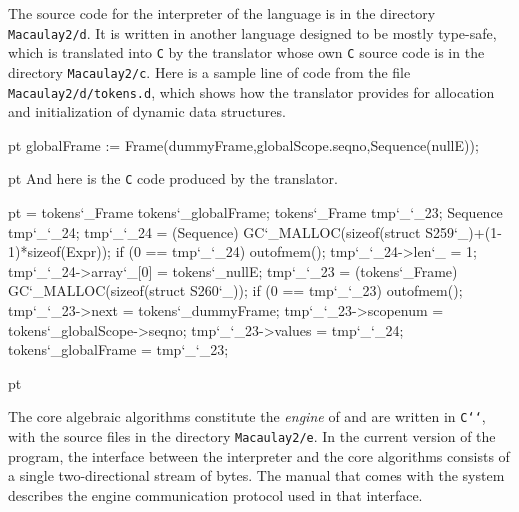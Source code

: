 The source code for the interpreter of the \Mtwo language is in the directory
{\tt Macaulay2/d}.  It is written in another language designed to be mostly
type-safe, which is translated into {\tt C} by the translator whose own
{\tt C} source code is in the directory {\tt Macaulay2/c}.  Here is a
sample line of code from the file {\tt Macaulay2/d/tokens.d}, which shows how
the translator provides for allocation and initialization of dynamic data
structures.
\par
{} pt
\begingroup
\tteight
\baselineskip=8pt
\lineskip=0pt
\obeyspaces
globalFrame := Frame(dummyFrame,globalScope.seqno,Sequence(nullE));\leavevmode\hss\endgraf
\endgroup
{}
\par
{} pt
\noindent
And here is the {\tt C} code produced by the translator.
\par
{} pt
\begingroup
\tteight
\baselineskip=\outputBaseLineSkip
\lineskip=0pt
\obeyspaces
\obeylines
tokens\char`\_Frame tokens\char`\_globalFrame;
tokens\char`\_Frame tmp\char`\_\char`\_23;
Sequence tmp\char`\_\char`\_24;
tmp\char`\_\char`\_24 = (Sequence) GC\char`\_MALLOC(sizeof(struct S259\char`\_)+(1-1)*sizeof(Expr));
if (0 == tmp\char`\_\char`\_24) outofmem();
tmp\char`\_\char`\_24->len\char`\_ = 1;
tmp\char`\_\char`\_24->array\char`\_[0] = tokens\char`\_nullE;
tmp\char`\_\char`\_23 = (tokens\char`\_Frame) GC\char`\_MALLOC(sizeof(struct S260\char`\_));
if (0 == tmp\char`\_\char`\_23) outofmem();
tmp\char`\_\char`\_23->next = tokens\char`\_dummyFrame;
tmp\char`\_\char`\_23->scopenum = tokens\char`\_globalScope->seqno;
tmp\char`\_\char`\_23->values = tmp\char`\_\char`\_24;
tokens\char`\_globalFrame = tmp\char`\_\char`\_23;
\endgroup
{}
\par
{} pt

The core algebraic algorithms constitute the {\sl engine} of \Mtwo and are
written in {\tt C\char`\+\char`\+}, with the source files in the directory
{\tt Macaulay2/e}.  In the current version of the program, the interface
between the interpreter and the core algorithms consists of a single
two-directional stream of bytes.  The manual that comes with the system
\cite{M2} describes the engine communication protocol used in that
interface.


